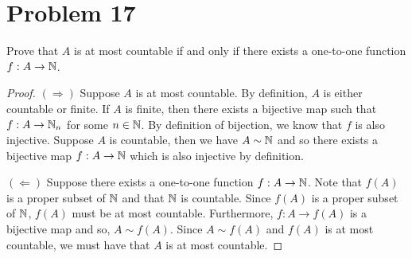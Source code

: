 \documentclass[11pt,a4paper]{article}
\begin{document}
\section*{Problem 17} Prove that \( A  \) is at most countable if and only if there exists a one-to-one function \( f: A \to \mathbb{N}  \).
\begin{proof}
\( (\Rightarrow) \) Suppose \( A  \) is at most countable. By definition, \( A  \) is either countable or finite. If \( A  \) is finite, then there exists a bijective map such that \( f: A \to \mathbb{N}_n   \) for some \( n \in \mathbb{N} \). By definition of bijection, we know that \( f  \) is also injective. Suppose \( A  \) is countable, then we have \( A \sim \mathbb{N}  \) and so there exists a bijective map \( f: A \to \mathbb{N}  \) which is also injective by definition. 


\( (\Leftarrow) \) Suppose there exists a one-to-one function \( f: A \to \mathbb{N} \). Note that \( f(A)    \) is a proper subset of \( \mathbb{N} \) and that \( \mathbb{N}  \) is countable. Since \( f(A)  \) is a proper subset of \( \mathbb{N}  \), \( f(A)  \) must be at most countable. Furthermore, \( f: A \to f(A) \) is a bijective map and so, \( A \sim f(A) \). Since \( A \sim f(A) \) and \( f(A) \) is at most countable, we must have that \( A  \) is at most countable.
\end{proof}
\end{document}
